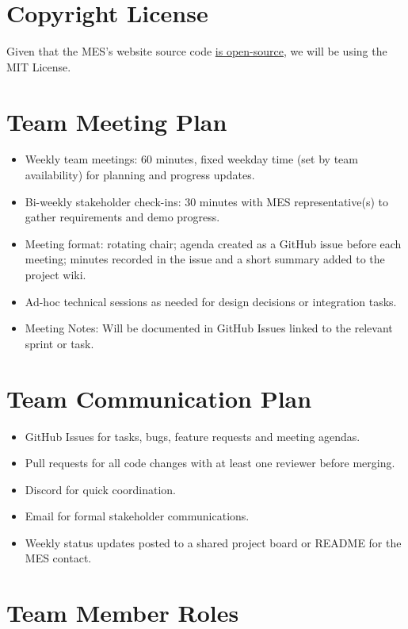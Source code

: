 \documentclass{article}
\begin{document}
\section{Copyright License}

Given that the MES's website source code \href{https://github.com/McMaster-Engineering-Society/MES-Website-App-Router}{is open-source}, we will be using the MIT License.

\section{Team Meeting Plan}

\begin{itemize}
  \item Weekly team meetings: 60 minutes, fixed weekday time (set by team availability) for planning and progress updates.
  \item Bi-weekly stakeholder check-ins: 30 minutes with MES representative(s) to gather requirements and demo progress.
  \item Meeting format: rotating chair; agenda created as a GitHub issue before each meeting; minutes recorded in the issue and a short summary added to the project wiki.
  \item Ad-hoc technical sessions as needed for design decisions or integration tasks.
  \item Meeting Notes: Will be documented in GitHub Issues linked to the relevant sprint or task.
\end{itemize}

\section{Team Communication Plan}

\begin{itemize}
  \item GitHub Issues for tasks, bugs, feature requests and meeting agendas.
  \item Pull requests for all code changes with at least one reviewer before merging.
  \item Discord for quick coordination.
  \item Email for formal stakeholder communications.
  \item Weekly status updates posted to a shared project board or README for the MES contact.
\end{itemize}

\section{Team Member Roles}
\end{document}
